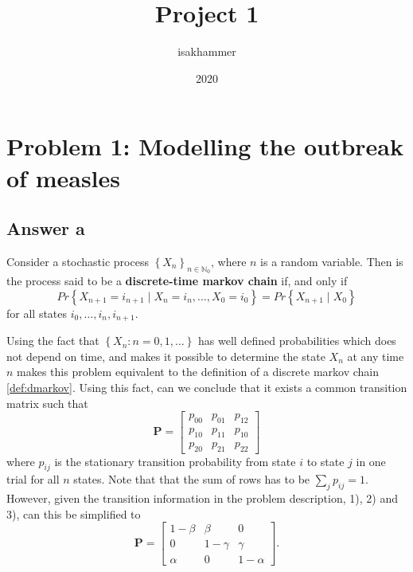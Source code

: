 \documentclass{article}
\title{Project 1}
\author{isakhammer }
\date{2020}
\theoremstyle{remark}
\begin{document}
\maketitle
\tableofcontents
\newpage

\newpage
\section{Problem 1: Modelling the outbreak of measles }%
\label{sec:problem_1_modelling_the_outbreak_of_measles_}


\subsection{Answer a}%
\label{sub:answer_a}

\begin{definition}
  \label{def:dmarkov}
  Consider a stochastic process $\left\{ X_{n} \right\}_{n \in  \mathbb{N}_0  }$, where $n$ is a random variable. Then is the process said to be a \textbf{discrete-time markov chain} if, and only if \[
  Pr \left \{ X_{n+1} = i_{n+1}   \mid X_{n}=i_{n},  \ldots,  X_{0} = i_{0}  \right \}  = Pr \left \{ X_{n+1}  \mid  X_{0} \right \} 
\] 
for all states $i_{0},  \ldots,  i_{n}, i_{n+1} $. 
  
\end{definition}

Using the fact that $\left\{ X_{n}: n=0,1,\ldots \right\}$ has well defined probabilities which does not depend on time, and makes it possible to determine the state $X_{n}$ at any time $n$ makes this problem equivalent to the definition of a discrete markov chain \ref{def:dmarkov}. Using this fact, can we conclude that it exists a common transition matrix such that \[
\mathbf{P} = \begin{bmatrix} 
  p_{00}  & p_{01}  &  p_{12} \\
  p_{10}  &  p_{11}  &  p_{10} \\
  p_{20}  & p_{21}  & p_{22}
\end{bmatrix} 
\] 
where $p_{ij}$ is the stationary transition probability from state $i $ to state $j$ in one trial for all $n$ states. Note that that the sum of rows has to be $\sum_{j}^{}  p_{ij} = 1$. However, given the transition information in the problem description, 1), 2) and 3), can this be simplified to \[
\mathbf{P} = \begin{bmatrix} 
1- \beta   &  \beta  & 0\\
0  &  1-\gamma  & \gamma \\
\alpha   &  0  & 1-\alpha 
\end{bmatrix} 
.
\]  
\end{document}

